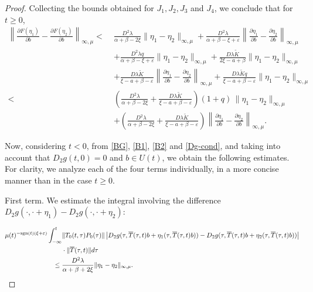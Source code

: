 \documentclass[9pt]{amsart}
\numberwithin{equation}{section}
\numberwithin{lemma}{section}
\begin{document}
\begin{proof}
\noindent
Collecting the bounds obtained for \( J_1, J_2, J_3 \) and \( J_4 \), we conclude that for \( t \geq 0 \),
\begin{align}
\left\|\frac{\partial F(\eta_1)}{\partial b} - \frac{\partial F(\eta_2)}{\partial b} \right\|_{\infty,\mu} 
<\;& \frac{D^2\lambda}{\alpha+\beta-2\xi} \|\eta_1 - \eta_2\|_{\infty,\mu} 
+ \frac{D^2\lambda}{\alpha+\beta-\xi+\varepsilon} 
  \left\| \frac{\partial \eta_1}{\partial b} - \frac{\partial \eta_2}{\partial b} \right\|_{\infty,\mu} \nonumber\\
&+ \frac{D^2\lambda q}{\alpha+\beta-\xi+\varepsilon} \|\eta_1 - \eta_2\|_{\infty,\mu} 
+ \frac{D\lambda\tilde{K}}{2\xi - a + \beta} \|\eta_1 - \eta_2\|_{\infty,\mu} \nonumber\\
&+ \frac{D\lambda\tilde{K}}{\xi - a + \beta - \varepsilon} 
  \left\| \frac{\partial \eta_1}{\partial b} - \frac{\partial \eta_2}{\partial b} \right\|_{\infty,\mu} 
+ \frac{D\lambda\tilde{K} q}{\xi - a + \beta - \varepsilon} \|\eta_1 - \eta_2\|_{\infty,\mu} \nonumber\\[0.5em]
<\;& \left( \frac{D^2\lambda}{\alpha+\beta-2\xi} + \frac{D\lambda\tilde{K}}{\xi - a + \beta - \varepsilon} \right) (1+q)\, \|\eta_1 - \eta_2\|_{\infty,\mu} \nonumber\\
&+ \left( \frac{D^2\lambda}{\alpha+\beta-2\xi} + \frac{D\lambda\tilde{K}}{\xi - a + \beta - \varepsilon} \right) 
  \left\| \frac{\partial \eta_1}{\partial b} - \frac{\partial \eta_2}{\partial b} \right\|_{\infty,\mu}. \label{Dfn12-tmayorcero}
\end{align}

Now, considering $t<0$, from \eqref{BG}, \eqref{B1}, \eqref{B2} and \eqref{Dg-cond}, and taking into account that $D_2g(t,0)=0$ and $b \in U(t)$, we obtain the following estimates. For clarity, we analyze each of the four terms individually, in a more concise manner than in the case $t \geq 0$.


\medskip
\noindent
First term. We estimate the integral involving the difference $D_2g(\cdot, \cdot + \eta_1) - D_2g(\cdot, \cdot + \eta_2)$:

\begin{equation*}
\begin{split}
\mu(t)^{-\textnormal{sgn}(t)(\xi+\varepsilon)} \int_{-\infty}^{t} & \|T_0(t,\tau)P_0(\tau)\|
\left| D_2g(\tau,\overline{T}(\tau,t)b+\eta_1(\tau,\overline{T}(\tau,t)b)) 
- D_2g(\tau,\overline{T}(\tau,t)b+\eta_2(\tau,\overline{T}(\tau,t)b)) \right|
\\
& \cdot \|\overline{T}(\tau,t)\| d\tau
\\
\leq \; & \frac{D^2 \lambda}{\alpha+\beta+2\xi} \|\eta_1 - \eta_2\|_{\infty,\mu}.
\end{split}
\end{equation*}


\end{proof}
\end{document}

